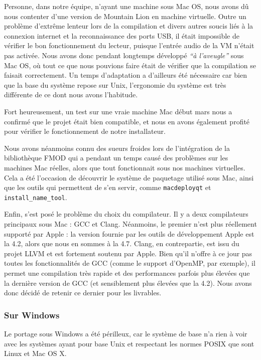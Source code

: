 Personne, dans notre équipe, n'ayant une machine sous Mac OS, nous avons dû nous contenter d'une version de Mountain Lion en machine virtuelle. Outre un problème d'extrême lenteur lors de la compilation et divers autres soucis liés à la connexion internet et la reconnaissance des ports USB, il était impossible de vérifier le bon fonctionnement du lecteur, puisque l'entrée audio de la VM n'était pas activée. Nous avons donc pendant longtemps développé \textit{``à l'aveugle''} sous Mac OS, où tout ce que nous pouvions faire était de vérifier que la compilation se faisait correctement.
Un temps d'adaptation a d'ailleurs été nécessaire car bien que la base du système repose sur Unix, l'ergonomie du système est très différente
de ce dont nous avons l'habitude.

Fort heureusement, un test sur une vraie machine Mac début mars nous a confirmé que le projet était bien compatible, et nous en avons également profité pour vérifier le fonctionnement de notre installateur.

Nous avons néanmoins connu des sueurs froides lors de l'intégration de la bibliothèque FMOD qui a pendant un temps causé des
problèmes sur les machines Mac réelles, alors que tout fonctionnait sous nos machines virtuelles. Cela a été l'occasion de découvrir
le système de paquetage utilisé sous Mac, ainsi que les outils qui permettent de s'en servir, comme \texttt{macdeployqt} et \texttt{install\_name\_tool}.

Enfin, s'est posé le problème du choix du compilateur. Il y a deux compilateurs principaux sous Mac : \ac{GCC} et Clang.
Néanmoins, le premier n'est plus réellement supporté par Apple : la version fournie par les outils de développement Apple est la 4.2,
alors que nous en sommes à la 4.7. Clang, en contrepartie, est issu du projet LLVM et est fortement soutenu par Apple.
Bien qu'il n'offre à ce jour pas toutes les fonctionnalités de \ac{GCC} (comme le support d'OpenMP, par exemple), il permet une
compilation très rapide et des performances parfois plus élevées que la dernière version de \ac{GCC} (et sensiblement plus élevées que la 4.2).
Nous avons donc décidé de retenir ce dernier pour les livrables.
\subsubsection*{Sur Windows}

Le portage sous Windows a été périlleux, car le système de base n'a rien à voir avec les systèmes ayant pour base Unix et respectant
les normes POSIX que sont Linux et Mac OS X.

